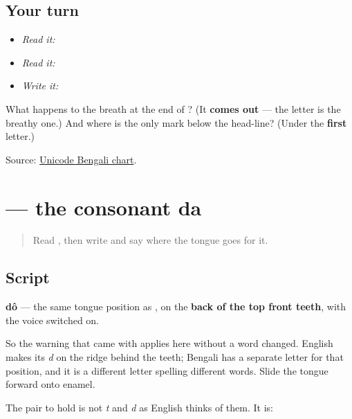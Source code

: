 \subsection*{Your turn}
\begin{itemize}
\raggedright
  \item \emph{Read it:} 
  \item \emph{Read it:} 
  \item \emph{Write it:} 
\end{itemize}

\begin{tcolorbox}[breakable,colback=teal!4,colframe=teal!35!black,title={Before you move on}]
What happens to the breath at the end of \textbf{}? (It \textbf{comes out} — the letter is the breathy one.) And where is the only mark below the head-line? (Under the \textbf{first} letter.)

Source: \href{https://www.unicode.org/charts/PDF/U0980.pdf}{Unicode Bengali chart}.
\end{tcolorbox}
\section[dô]{ — the consonant da}

\label{lesson:BN-W03-da}



\begin{quote}
Read \textbf{}, then write \textbf{} and say where the tongue goes for it.
\end{quote}

\subsection*{Script}
\begin{quote}
\end{quote}

\textbf{dô} — the same tongue position as \textbf{}, on the \textbf{back of the top front teeth}, with the voice switched on.

So the warning that came with \textbf{} applies here without a word changed. English makes its \emph{d} on the ridge behind the teeth; Bengali has a separate letter for that position, and it is a different letter spelling different words. Slide the tongue forward onto enamel.

The pair to hold is not \emph{t} and \emph{d} as English thinks of them. It is:

